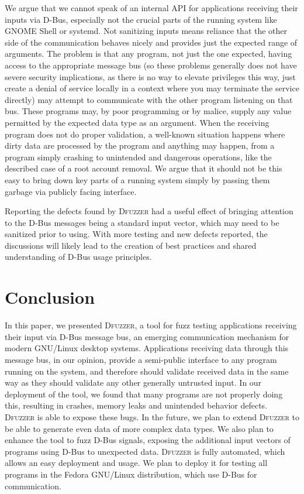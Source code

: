 \documentclass[conference]{IEEEtran}
\begin{document}
We argue that we cannot speak of an internal API for applications receiving
their inputs via D-Bus, especially not the crucial parts of the running system
like GNOME Shell or systemd. Not sanitizing inputs means reliance that the
other side of the communication behaves nicely and provides just the expected
range of arguments. The problem is that any program, not just the one expected,
having access to the appropriate message bus (so these problems generally does
not have severe security implications, as there is no way to elevate privileges
this way, just create a denial of service locally in a context where you may
terminate the service directly) may attempt to communicate with the other
program listening on that bus.
These programs may, by poor programming or by malice, supply any value
permitted by the expected data type as an argument.  When the receiving program
does not do proper validation, a well-known situation happens where dirty data
are processed by the program and anything may happen, from a program simply
crashing to unintended and dangerous operations, like the described case of a
root account removal. We argue that it should not be this easy to bring down
key parts of a running system simply by passing them garbage via publicly
facing interface.


Reporting the defects found by \textsc{Dfuzzer} had a useful effect of bringing
attention to the D-Bus messages being a standard input vector, which may need to
be sanitized prior to using. With more testing and new defects reported, the
discussions will likely lead to the creation of best practices and shared
understanding of D-Bus usage principles.


\section{Conclusion}
In this paper, we presented \textsc{Dfuzzer}, a tool for fuzz testing
applications receiving their input via D-Bus message bus, an emerging
communication mechanism for modern GNU/Linux desktop systems. Applications
receiving data through this message bus, in our opinion, provide a semi-public
interface to any program running on the system, and therefore should validate
received data in the same way as they should validate any other generally
untrusted input. In our deployment of the tool, we found that many programs are
not properly doing this, resulting in crashes, memory leaks and unintended
behavior defects. \textsc{Dfuzzer} is able to expose these bugs.  In the
future, we plan to extend \textsc{Dfuzzer} to be able to generate even data of
more complex data types. We also plan to enhance the tool to fuzz D-Bus
signals, exposing the additional input vectors of programs using D-Bus to
unexpected data.  \textsc{Dfuzzer} is fully automated, which allows an easy
deployment and usage.  We plan to deploy it for testing all programs in the
Fedora GNU/Linux distribution, which use D-Bus for communication.
\end{document}
